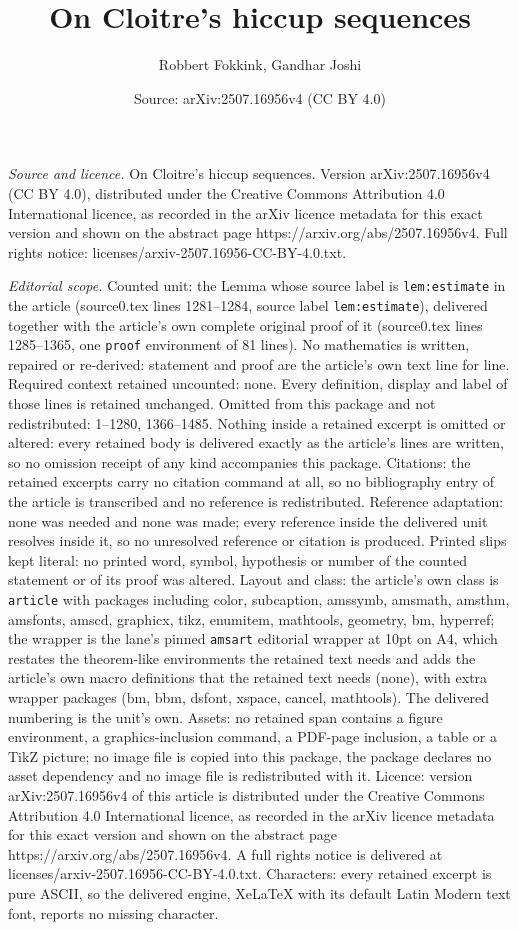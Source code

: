 \documentclass[10pt,a4paper]{amsart}
\title[On Cloitre's hiccup sequences]{On Cloitre's hiccup sequences}
\author{Robbert Fokkink, Gandhar Joshi}
\date{Source: arXiv:2507.16956v4 (CC BY 4.0)}
\begin{document}
\maketitle

\noindent\emph{Source and licence.} On Cloitre's hiccup sequences. Version arXiv:2507.16956v4 (CC BY 4.0), distributed under the Creative Commons Attribution 4.0 International licence, as recorded in the arXiv licence metadata for this exact version and shown on the abstract page https://arxiv.org/abs/2507.16956v4. Full rights notice: licenses/arxiv-2507.16956-CC-BY-4.0.txt.\par\smallskip

\noindent\textit{Editorial scope.} Counted unit: the Lemma whose source label is \texttt{lem:estimate} in the article (source0.tex lines 1281--1284, source label \texttt{lem:estimate}), delivered together with the article's own complete original proof of it (source0.tex lines 1285--1365, one \texttt{proof} environment of 81 lines). No mathematics is written, repaired or re-derived: statement and proof are the article's own text line for line. Required context retained uncounted: none. Every definition, display and label of those lines is retained unchanged. Omitted from this package and not redistributed: 1--1280, 1366--1485. Nothing inside a retained excerpt is omitted or altered: every retained body is delivered exactly as the article's lines are written, so no omission receipt of any kind accompanies this package. Citations: the retained excerpts carry no citation command at all, so no bibliography entry of the article is transcribed and no reference is redistributed. Reference adaptation: none was needed and none was made; every reference inside the delivered unit resolves inside it, so no unresolved reference or citation is produced. Printed slips kept literal: no printed word, symbol, hypothesis or number of the counted statement or of its proof was altered. Layout and class: the article's own class is \texttt{article} with packages including color, subcaption, amssymb, amsmath, amsthm, amsfonts, amscd, graphicx, tikz, enumitem, mathtools, geometry, bm, hyperref; the wrapper is the lane's pinned \texttt{amsart} editorial wrapper at 10pt on A4, which restates the theorem-like environments the retained text needs and adds the article's own macro definitions that the retained text needs (none), with extra wrapper packages (bm, bbm, dsfont, xspace, cancel, mathtools). The delivered numbering is the unit's own. Assets: no retained span contains a figure environment, a graphics-inclusion command, a PDF-page inclusion, a table or a TikZ picture; no image file is copied into this package, the package declares no asset dependency and no image file is redistributed with it. Licence: version arXiv:2507.16956v4 of this article is distributed under the Creative Commons Attribution 4.0 International licence, as recorded in the arXiv licence metadata for this exact version and shown on the abstract page https://arxiv.org/abs/2507.16956v4. A full rights notice is delivered at licenses/arxiv-2507.16956-CC-BY-4.0.txt. Characters: every retained excerpt is pure ASCII, so the delivered engine, XeLaTeX with its default Latin Modern text font, reports no missing character.
\end{document}
